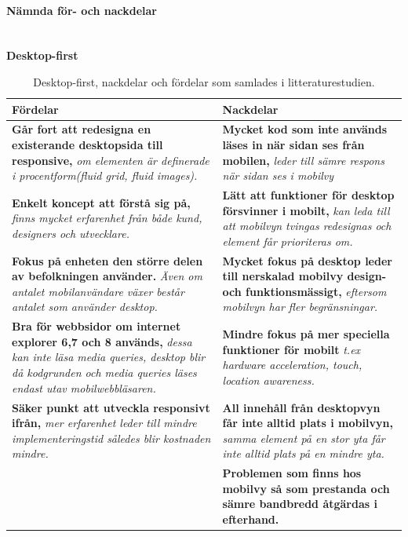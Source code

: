 \documentclass[11pt]{article}
\begin{document}
\paragraph{Nämnda för- och nackdelar}\mbox{} \\

\textbf{Desktop-first}
\begin{table}[H]
\centering
\begin{tabular}{|p{7.2cm}|p{7.2cm}|}
\hline
Fördelar&Nackdelar\\ \hline
\textbf{Går fort att redesigna en existerande desktopsida till responsive, }\textit{om elementen är definerade i procentform(fluid grid, fluid images).}&\textbf{Mycket kod som inte används läses in när sidan ses från mobilen, }\textit{leder till sämre respons när sidan ses i mobilvy}\\ \hline
\textbf{Enkelt koncept att förstå sig på, }\textit{finns mycket erfarenhet från både kund, designers och utvecklare.}& \textbf{Lätt att funktioner för desktop försvinner i mobilt,} \textit{kan leda till att mobilvyn tvingas redesignas och element får prioriteras om.} \\ \hline
\textbf{Fokus på enheten den större delen av befolkningen använder. }\textit{Även om antalet mobilanvändare växer består antalet som använder desktop.}&\textbf{Mycket fokus på desktop leder till nerskalad mobilvy design- och funktionsmässigt, }\textit{eftersom mobilvyn har fler begränsningar.}\\ \hline
\textbf{Bra för webbsidor om internet explorer 6,7 och 8 används, }\textit{dessa kan inte läsa media queries, desktop blir då kodgrunden och media queries läses endast utav mobilwebbläsaren.}&  \textbf{Mindre fokus  på mer speciella funktioner för mobilt} \textit{t.ex hardware acceleration, touch, location awareness.} \\ \hline
\textbf{Säker punkt att utveckla responsivt ifrån, }\textit{mer erfarenhet leder till mindre implementeringstid således blir kostnaden mindre.}&\textbf{All innehåll från desktopvyn får inte alltid plats i mobilvyn,} \textit{samma element på en stor yta får inte alltid plats på en mindre yta.}\\ \hline
~&\textbf{Problemen som finns hos mobilvy så som prestanda och sämre bandbredd åtgärdas i efterhand.}\\ \hline


    \end{tabular}
    \caption {Desktop-first, nackdelar och fördelar som samlades i litteraturestudien.}
\end{table}
\newpage
\end{document}
